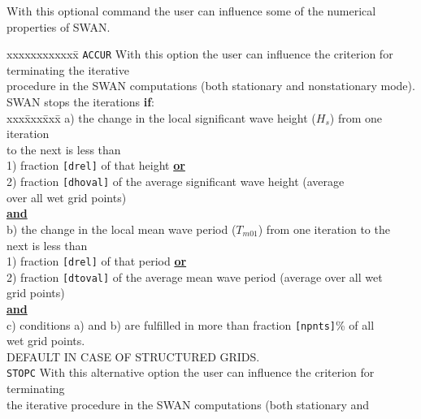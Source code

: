 \documentclass[12pt]{book}
\begin{document}
\noindent
With this optional command the user can influence some of the numerical properties of SWAN.
\begin{tabbing}
xxxxxxxxxxxx\= \kill
{\tt ACCUR}    \> With this option the user can influence the criterion for terminating the iterative\+\\
                  procedure in the SWAN computations (both stationary and nonstationary mode).\\
                  SWAN stops the iterations {\bf if}:\\
                  \pushtabs
                  xxx\=xxx\=xxx\= \kill
                  a) \> the change in the local significant wave height ($H_s$) from one iteration\+\\
                        to the next is less than\\
                        1) \> fraction {\tt [drel]} of that height \underline{{\bf or}}\\
                        2) \> fraction {\tt [dhoval]} of the average significant wave height (average\+\\
                              over all wet grid points)\-\-\\
                  \underline{{\bf and}} \\
                  b) \> the change in the local mean wave period ($T_{m01}$) from one iteration to the\+\\
                        next is less than\\
                        1) \> fraction {\tt [drel]} of that period \underline{{\bf or}}\\
                        2) \> fraction {\tt [dtoval]} of the average mean wave period (average over all wet\+\\
                              grid points)\-\-\\
                  \underline{{\bf and}} \\
                  c) \> conditions a) and b) are fulfilled in more than fraction {\tt [npnts]}\% of all\+\\
                        wet grid points.\-\\
                  \poptabs
                  DEFAULT IN CASE OF STRUCTURED GRIDS.\-\\
{\tt STOPC}    \> With this alternative option the user can influence the criterion for terminating\+\\
                  the iterative procedure in the SWAN computations (both stationary and\\

\end{tabbing}
\end{document}
